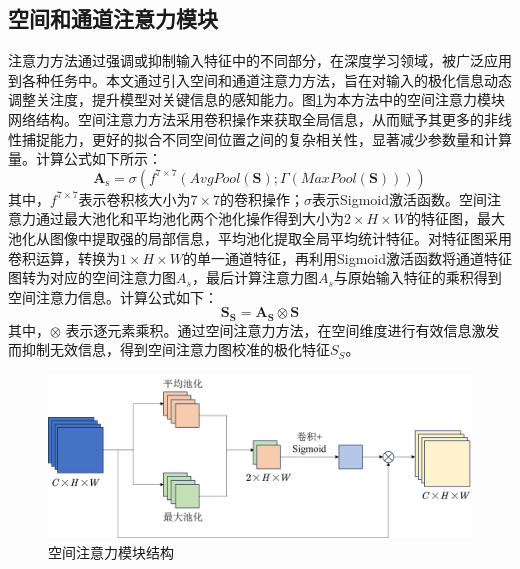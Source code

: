 \subsection{空间和通道注意力模块}
注意力方法通过强调或抑制输入特征中的不同部分，在深度学习领域，被广泛应用到各种任务中。本文通过引入空间和通道注意力方法，旨在对输入的极化信息动态调整关注度，提升模型对关键信息的感知能力。图\ref{fig:spatial}为本方法中的空间注意力模块网络结构。空间注意力方法采用卷积操作来获取全局信息，从而赋予其更多的非线性捕捉能力，更好的拟合不同空间位置之间的复杂相关性，显著减少参数量和计算量。计算公式如下所示：
\begin{equation}
    \textbf{A}_\text{s}=\sigma(f^{7\times 7}(AvgPool(\textbf{S});\Gamma(MaxPool(\textbf{S}))))
\end{equation}
其中，$f^{7\times 7}$表示卷积核大小为$7\times 7$的卷积操作；$\sigma$表示Sigmoid激活函数。空间注意力通过最大池化和平均池化两个池化操作得到大小为$2\times H \times W$的特征图，最大池化从图像中提取强的局部信息，平均池化提取全局平均统计特征。对特征图采用卷积运算，转换为$1\times H\times W$的单一通道特征，再利用Sigmoid激活函数将通道特征图转为对应的空间注意力图$A_s$，最后计算注意力图$A_s$与原始输入特征的乘积得到空间注意力信息。计算公式如下：
\begin{equation}
    \textbf{S}_\textbf{S}=\textbf{A}_\textbf{S} \otimes \textbf{S}
\end{equation}
其中，$\otimes$ 表示逐元素乘积。通过空间注意力方法，在空间维度进行有效信息激发而抑制无效信息，得到空间注意力图校准的极化特征$S_S$。

\label{sec:空间和通道注意力模块}
\begin{figure}[ht!]
    \centering
    \includegraphics[width=14cm]{pic/chapter3/Spatial.png}
    \caption{空间注意力模块结构}
    \label{fig:spatial}
\end{figure}

